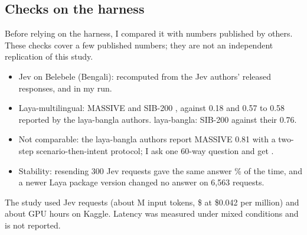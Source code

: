 \documentclass[11pt]{article}
\begin{document}
\subsection{Checks on the harness}
\label{sec:audit}
Before relying on the harness, I compared it with numbers published by others.
These checks cover a few published numbers; they are not an independent replication of this study.
\begin{itemize}
\item Jev on Belebele (Bengali): \jevBelebeleZenodo{} recomputed from the Jev authors' released responses, and \jevBelebele{} in my run.
\item Laya-multilingual: MASSIVE \layamlNativeMassive{} and SIB-200 \layamlNativeSib, against 0.18 and 0.57 to 0.58 reported by the laya-bangla authors. laya-bangla: SIB-200 \layabnNativeSib{} against their 0.76.
\item Not comparable: the laya-bangla authors report MASSIVE 0.81 with a two-step scenario-then-intent protocol; I ask one 60-way question and get \acclayabnMasNat.
\item Stability: resending 300 Jev requests gave the same answer \jevRetestSame\% of the time, and a newer Laya package version changed no answer on 6{,}563 requests.
\end{itemize}
The study used \jevRequests{} Jev requests (about \jevTokensM{}M input tokens, \$\jevUsd{} at \$0.042 per million) and about \gpuHours{} GPU hours on Kaggle.
Latency was measured under mixed conditions and is not reported.
\end{document}
